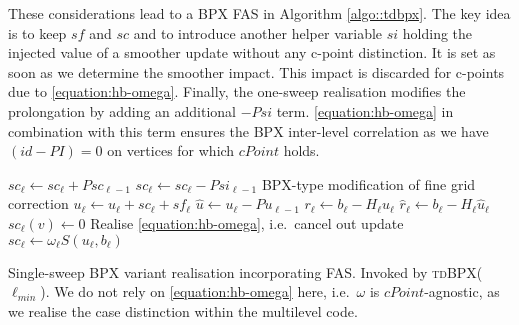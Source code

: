 These considerations lead to a BPX FAS in Algorithm
\ref{algo::tdbpx}.
The key idea is to keep $sf$ and $sc$ and to introduce another helper variable
$si$ holding the injected value of a smoother update without any c-point
distinction. 
It is set as soon as we determine the smoother impact.
This impact is discarded for c-points due to
\eqref{equation:hb-omega}.
Finally, the one-sweep realisation modifies the prolongation by adding an
additional $-Psi$ term. 
\eqref{equation:hb-omega} in combination with this term ensures the BPX
inter-level correlation as we have $(id - PI)=0$ on vertices for
which $cPoint$ holds.

\begin{algorithm}[htb]
 \SetAlgoNoLine
    \begin{algorithmic}[1]
         \State $sc_\ell \leftarrow sc_\ell + P sc_{\ell -1}$ 
         \State {}
         {
           \State \phantom{xx} $sc_{\ell} \leftarrow sc_{\ell} -
           Psi_{\ell-1}$
           \Comment BPX-type modification of fine grid correction
           \label{line:tdbpx:pmodification}
         }         
         \State $u_\ell \leftarrow u_\ell + sc_{\ell} + sf_{\ell}$
         \State $\hat u \leftarrow u_\ell - Pu_{\ell -1}$
         \State
          {
           \State \phantom{xx} 
         }
         \State $r_\ell \leftarrow b_\ell - H_\ell u_\ell$
         \State $\hat r_\ell \leftarrow b_\ell - H_\ell \hat u_\ell$
        \State
		 {
			\State \phantom{xx}  $sc_\ell (v) \leftarrow 0$
			\Comment Realise \eqref{equation:hb-omega}, i.e.~cancel out
			update}{
			\State \phantom{xx}  $sc_\ell \leftarrow \omega _{\ell} S(u_\ell,b_\ell)$
		}
		\State
      \EndFunction
  \end{algorithmic}
  \caption{
    Single-sweep BPX variant realisation incorporating FAS. Invoked by
     \textsc{tdBPX}($\ell _{min}$). We do not rely on
     \eqref{equation:hb-omega} here, i.e.~$\omega $ is $cPoint$-agnostic, as we
     realise the case distinction within the multilevel code.
    \label{algo::tdbpx}
  }
\end{algorithm} 
 

